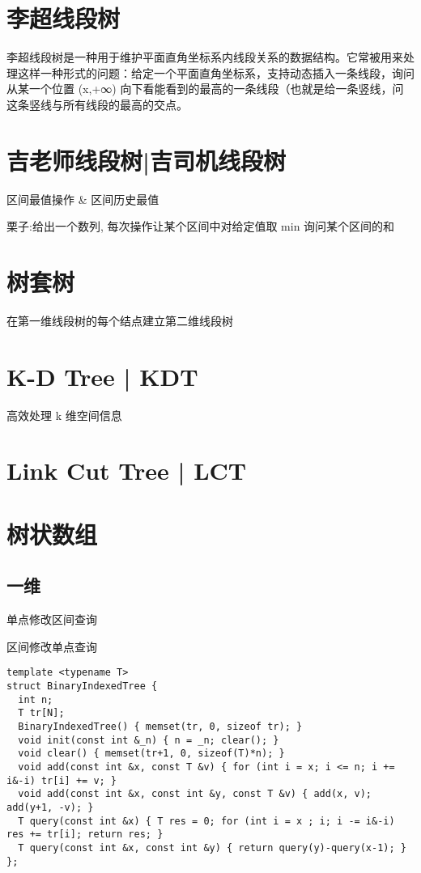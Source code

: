 \documentclass[12pt]{article}
\begin{document}
{{{{{{{{{{{{{{{{\section{李超线段树}

李超线段树是一种用于维护平面直角坐标系内线段关系的数据结构。它常被用来处理这样一种形式的问题：给定一个平面直角坐标系，支持动态插入一条线段，询问从某一个位置 (x,+∞) 向下看能看到的最高的一条线段（也就是给一条竖线，问这条竖线与所有线段的最高的交点。

\section{吉老师线段树|吉司机线段树}

区间最值操作 \& 区间历史最值

栗子:给出一个数列, 每次操作让某个区间中对给定值取 min 询问某个区间的和

\section{树套树}

在第一维线段树的每个结点建立第二维线段树

\section{K-D Tree | KDT}

高效处理 k 维空间信息

\section{Link Cut Tree | LCT}


\section{树状数组}
\subsection{一维}
单点修改区间查询

区间修改单点查询

{\setmainfont{Consolas}
\begin{lstlisting}
template <typename T>
struct BinaryIndexedTree {
  int n;
  T tr[N];
  BinaryIndexedTree() { memset(tr, 0, sizeof tr); }
  void init(const int &_n) { n = _n; clear(); }
  void clear() { memset(tr+1, 0, sizeof(T)*n); }
  void add(const int &x, const T &v) { for (int i = x; i <= n; i += i&-i) tr[i] += v; }
  void add(const int &x, const int &y, const T &v) { add(x, v); add(y+1, -v); }
  T query(const int &x) { T res = 0; for (int i = x ; i; i -= i&-i) res += tr[i]; return res; }
  T query(const int &x, const int &y) { return query(y)-query(x-1); }
};
\end{lstlisting}

}}}}}}}}}}}}}}}}}
\end{document}
